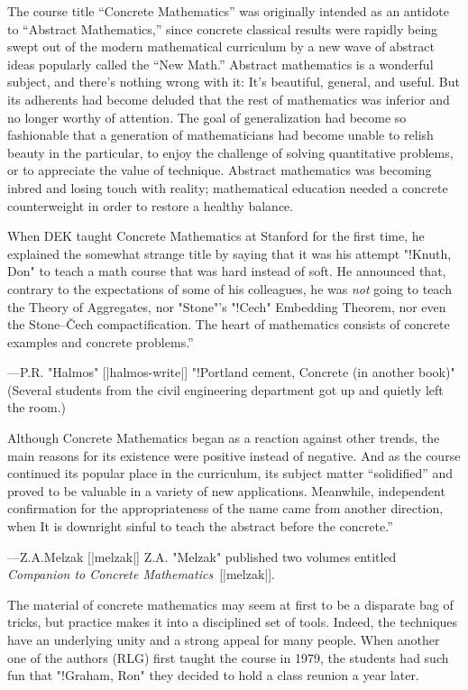 The course title ``Concrete Mathematics'' was originally intended
as an antidote to ``Abstract Mathematics,\qback'' since concrete
classical results were rap\-idly being swept out of the modern mathematical
curriculum by a new wave of abstract ideas popularly called the
``New Math.\qback'' Abstract mathematics is a wonderful subject, and
there's nothing wrong with it: It's beautiful, general, and useful.
But its adherents had become deluded that the rest of mathematics was
inferior and no longer worthy of attention. The goal of generalization
had become so fashionable that a generation of mathematicians had
become unable to relish beauty in the particular, to enjoy the challenge
of solving quantitative problems, or to appreciate the value of technique.
Abstract mathematics was becoming inbred and losing touch with
reality; mathematical education needed a concrete counterweight
in order to restore a healthy balance.

When DEK taught Concrete Mathematics at Stanford for the first time,
he explained the somewhat strange title by saying that it was his attempt
"!Knuth, Don"
to teach a math course that was hard instead of soft. He announced that,
contrary to the expectations of some of his colleagues, he was
{\it not\/} going to teach the Theory of Aggregates, nor "Stone"'s "!Cech"
Embedding Theorem, nor even the Stone--\v Cech compactification.
\g\noindent{}The heart of mathematics consists of concrete examples and
concrete problems.''\par\hfill\kern-10pt\dash---P.\thinspace R.\thinspace
 "Halmos" [|halmos-write|]\g %
"!Portland cement, \string\see Concrete (in another book)"
(Several students from the civil engineering department got up
and quietly left the room.)

Although Concrete Mathematics began as a reaction against other trends,
the main reasons for its existence were positive instead of negative.
And as the course continued its popular place in the curriculum,
its subject matter ``solidified'' and proved to be valuable in a variety
of new applications. Meanwhile, independent confirmation for the
appropriateness of the name came from another direction, when
\g\noindent{}It is downright sinful to teach the abstract before the concrete.''\par
\hfill\kern-10pt\dash---Z.\thinspace A.\thinspace Melzak [|melzak|]\g
Z.\thinspace A. "Melzak" published two volumes entitled
{\sl Companion to Concrete Mathematics\/}~[|melzak|].

The material of concrete mathematics may seem at first to be a
disparate bag of tricks, but practice makes it into a disciplined
set of tools. Indeed, the techniques have an underlying unity
and a strong appeal for many people. When another one of the authors
(RLG) first taught the course in 1979, the students had such fun that
"!Graham, Ron"
they decided to hold a class reunion a year later.

